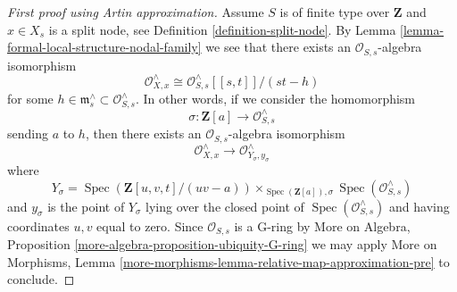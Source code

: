 \documentclass{stacks-project}
\theoremstyle{plain}
\theoremstyle{definition}
\theoremstyle{remark}
\numberwithin{equation}{subsection}
\def\Spec{\mathop{\mathrm{Spec}}}
\begin{document}
\begin{proof}[First proof using Artin approximation]
\medskip\noindent
Assume $S$ is of finite type over $\mathbf{Z}$ and
$x \in X_s$ is a split node, see Definition \ref{definition-split-node}.
By Lemma \ref{lemma-formal-local-structure-nodal-family} we see that there
exists an $\mathcal{O}_{S, s}$-algebra isomorphism
$$
\mathcal{O}_{X, x}^\wedge \cong
\mathcal{O}_{S, s}^\wedge[[s, t]]/(st - h)
$$
for some $h \in \mathfrak m_s^\wedge \subset \mathcal{O}_{S, s}^\wedge$.
In other words, if we consider the homomorphism
$$
\sigma : \mathbf{Z}[a] \longrightarrow \mathcal{O}_{S, s}^\wedge
$$
sending $a$ to $h$, then there exists an $\mathcal{O}_{S, s}$-algebra
isomorphism
$$
\mathcal{O}_{X, x}^\wedge
\longrightarrow
\mathcal{O}_{Y_\sigma, y_\sigma}^\wedge
$$
where
$$
Y_\sigma = \Spec(\mathbf{Z}[u, v, t]/(uv - a))
\times_{\Spec(\mathbf{Z}[a]), \sigma} \Spec(\mathcal{O}_{S, s}^\wedge)
$$
and $y_\sigma$ is the point of $Y_\sigma$ lying over
the closed point of $\Spec(\mathcal{O}_{S, s}^\wedge)$
and having coordinates $u, v$ equal to zero. Since
$\mathcal{O}_{S, s}$ is a G-ring by
More on Algebra, Proposition \ref{more-algebra-proposition-ubiquity-G-ring}
we may apply More on Morphisms, Lemma
\ref{more-morphisms-lemma-relative-map-approximation-pre}
to conclude.
\end{proof}
\end{document}
